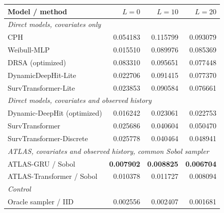 \begin{center}\begin{minipage}{\textwidth}\centering\small
\begin{tabular}{lrrr}
\toprule
Model / method & $L=0$ & $L=10$ & $L=20$ \\\midrule
\multicolumn{4}{l}{\textit{Direct models, covariates only}}\\
CPH & 0.054183 & 0.115799 & 0.093079 \\
Weibull-MLP & 0.015510 & 0.089976 & 0.085369 \\
DRSA (optimized) & 0.083310 & 0.095651 & 0.077448 \\
DynamicDeepHit-Lite & 0.022706 & 0.091415 & 0.077370 \\
SurvTransformer-Lite & 0.023853 & 0.090584 & 0.076661 \\
\multicolumn{4}{l}{\textit{Direct models, covariates and observed history}}\\
Dynamic-DeepHit (optimized) & 0.016242 & 0.023061 & 0.022753 \\
SurvTransformer & 0.025686 & 0.040604 & 0.050470 \\
SurvTransformer-Discrete & 0.025778 & 0.040464 & 0.048941 \\
\multicolumn{4}{l}{\textit{ATLAS, covariates and observed history, common Sobol sampler}}\\
ATLAS-GRU / Sobol & \textbf{0.007902} & \textbf{0.008825} & \textbf{0.006704} \\
ATLAS-Transformer / Sobol & 0.010378 & 0.011727 & 0.008094 \\
\multicolumn{4}{l}{\textit{Control}}\\
Oracle sampler / IID & 0.002556 & 0.002407 & 0.001681 \\
\bottomrule\end{tabular}
\label{tab:cr_survival}
\end{minipage}\end{center}